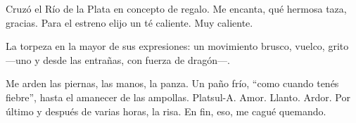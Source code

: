 
Cruzó el Río de la Plata en concepto de regalo. Me encanta, qué hermosa
taza, gracias. Para el estreno elijo un té caliente. Muy caliente.

La torpeza en la mayor de sus expresiones: un movimiento brusco, vuelco,
grito ---uno y desde las entrañas, con fuerza de dragón---.

Me arden las piernas, las manos, la panza. Un paño frío, ``como cuando
tenés fiebre'', hasta el amanecer de las ampollas. Platsul-A. Amor.
Llanto. Ardor. Por último y después de varias horas, la risa. En fin,
eso, me cagué quemando.

